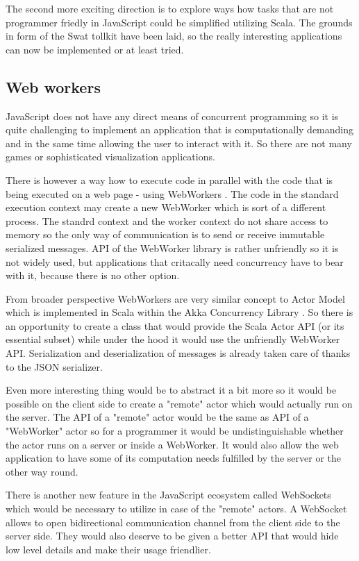 \documentclass[12pt,a4paper]{report}
\begin{document}
The second more exciting direction is to explore ways how tasks that are not programmer friedly in JavaScript could be simplified utilizing Scala. The grounds in form of the Swat tollkit have been laid, so the really interesting applications can now be implemented or at least tried.

\subsection{Web workers}

JavaScript does not have any direct means of concurrent programming so it is quite challenging to implement an application that is computationally demanding and in the same time allowing the user to interact with it. So there are not many games or sophisticated visualization applications.

There is however a way how to execute code in parallel with the code that is being executed on a web page - using WebWorkers \cite{WebWorkers}. The code in the standard execution context may create a new WebWorker which is sort of a different process. The standrd context and the worker context do not share access to memory so the only way of communication is to send or receive immutable serialized messages. API of the WebWorker library is rather unfriendly so it is not widely used, but applications that critacally need concurrency have to bear with it, because there is no other option.

From broader perspective WebWorkers are very similar concept to Actor Model \cite{Actors} which is implemented in Scala within the Akka Concurrency Library \cite{Akka}. So there is an opportunity to create a class that would provide the Scala Actor API (or its essential subset) while under the hood it would use the unfriendly WebWorker API. Serialization and deserialization of messages is already taken care of thanks to the JSON serializer. 

Even more interesting thing would be to abstract it a bit more so it would be possible on the client side to create a "remote" actor which would actually run on the server. The API of a "remote" actor would be the same as API of a "WebWorker" actor so for a programmer it would be undistinguishable whether the actor runs on a server or inside a WebWorker. It would also allow the web application to have some of its computation needs fulfilled by the server or the other way round.

There is another new feature in the JavaScript ecosystem called WebSockets \cite{WebSockets} which would be necessary to utilize in case of the "remote" actors. A WebSocket allows to open bidirectional communication channel from the client side to the server side. They would also deserve to be given a better API that would hide low level details and make their usage friendlier.
\end{document}

